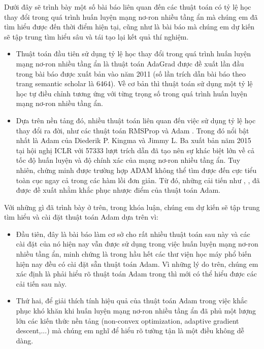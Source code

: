 \documentclass{article}[14pt]
\begin{document}
{    %
    Dưới đây sẽ trình bày một số bài báo liên quan đến các thuật toán có tỷ lệ học thay đổi trong quá trình huấn luyện mạng nơ-ron nhiều tầng ẩn mà chúng em đã tìm hiểu được đến thời điểm hiện tại, cũng như là bài báo mà chúng em dự kiến sẽ tập trung tìm hiểu sâu và tái tạo lại kết quả thí nghiệm.
    \begin{itemize}
        \item Thuật toán đầu tiên sử dụng tỷ lệ học thay đổi trong quá trình huấn luyện mạng nơ-ron nhiều tầng ẩn là thuật toán AdaGrad được đề xuất lần đầu trong bài báo \cite{Duchi2011AdaptiveSM} được xuất bản vào năm 2011 (số lần trích dẫn bài báo theo trang semantic scholar là 6464). Về cơ bản thì thuật toán sử dụng một tỷ lệ học tự điều chỉnh tương ứng với từng trọng số trong quá trình huấn luyện mạng nơ-ron nhiều tầng ẩn.
        \item Dựa trên nền tảng đó, nhiều thuật toán liên quan đến việc sử dụng tỷ lệ học thay đổi ra đời, như các thuật toán RMSProp \cite{Tieleman2012RMSProp} và Adam \cite{Kingma2015AdamAM}. Trong đó nổi bật nhất là Adam của Diederik P. Kingma và Jimmy L. Ba xuất bản năm 2015 tại hội nghị ICLR với 57333 lượt trích dẫn đã tạo nên sự khác biệt lớn về cả tốc độ huấn luyện và độ chính xác của mạng nơ-ron nhiều tầng ẩn. Tuy nhiên, \cite{Reddi2018OnTC} chứng minh được trường hợp ADAM không thể tìm được đến cực tiểu toàn cục ngay cả trong các hàm lồi đơn giản. Từ đó, những cải tiến như \cite{Reddi2018OnTC}, \cite{Dozat2016IncorporatingNM}, \cite{Zhang2017NormalizedDA} đã được đề xuất nhằm khắc phục nhược điểm của thuật toán Adam.
    \end{itemize}
    Với những gì đã trình bày ở trên, trong khóa luận, chúng em dự kiến sẽ tập trung tìm hiểu và cài đặt thuật toán Adam dựa trên \cite{Kingma2015AdamAM} vì:
    \begin{itemize}
        \item Đầu tiên, đây là bài báo làm cơ sở cho rất nhiều thuật toán sau này và các cài đặt của nó hiện nay vẫn được sử dụng trong việc huấn luyện mạng nơ-ron nhiều tầng ẩn, minh chứng là trong hầu hết các thư viện học máy phổ biến hiện nay đều có cài đặt sẵn thuật toán Adam. Vì những lý do trên, chúng em xác định là phải hiểu rõ thuật toán Adam trong \cite{Kingma2015AdamAM} thì mới có thể hiểu được các cải tiến sau này.
        \item Thứ hai, để giải thích tính hiệu quả của thuật toán Adam trong việc khắc phục khó khăn khi huấn luyện mạng nơ-ron nhiều tầng ẩn đã phủ một lượng lớn các kiến thức nền tảng (non-convex optimization, adaptive gradient descent,...) mà chúng em nghĩ để hiểu rõ tường tận là một điều không dễ dàng.
    \end{itemize}
    
}
\end{document}
